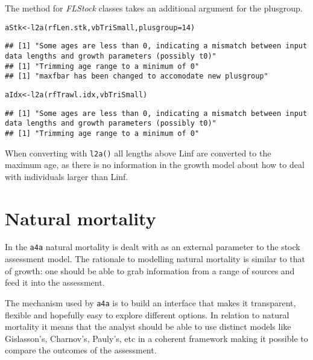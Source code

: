 \documentclass[a4paper,english,10pt]{article}\usepackage[]{graphicx}\usepackage[]{color}
\makeatletter
\newcommand{\hlnum}[1]{\textcolor[rgb]{0.2,0.2,0.2}{#1}}%
\newcommand{\hlstd}[1]{\textcolor[rgb]{0,0,0}{#1}}%
\newcommand{\hlkwb}[1]{\textcolor[rgb]{0.361,0.506,0.596}{#1}}%
\newcommand{\hlkwc}[1]{\textcolor[rgb]{0.361,0.506,0.596}{#1}}%
\newcommand{\hlkwd}[1]{\textcolor[rgb]{0.361,0.506,0.596}{#1}}%
\newenvironment{kframe}{%
 \def\at@end@of@kframe{}%
 \ifinner\ifhmode%
  \def\at@end@of@kframe{\end{minipage}}%
  \begin{minipage}{\columnwidth}%
 \fi\fi%
 \def\FrameCommand##1{\hskip\@totalleftmargin \hskip-\fboxsep
 \colorbox{shadecolor}{##1}\hskip-\fboxsep
     \hskip-\linewidth \hskip-\@totalleftmargin \hskip\columnwidth}%
 \MakeFramed {\advance\hsize-\width
   \@totalleftmargin\z@ \linewidth\hsize
   \@setminipage}}%
 {\par\unskip\endMakeFramed%
 \at@end@of@kframe}
\newenvironment{knitrout}{}{} %
\newcommand{\initiative}[1]{{\texttt{#1}}}
\newcommand{\code}[1]{{\texttt{#1}}}
\newcommand{\class}[1]{{\textit{#1}}}
\makeatother
\begin{document}
The method for \class{FLStock} classes takes an additional argument for the plusgroup.

\begin{knitrout}
\color{fgcolor}\begin{kframe}
\begin{alltt}
\hlstd{aStk} \hlkwb{<-} \hlkwd{l2a}\hlstd{(rfLen.stk, vbTriSmall,} \hlkwc{plusgroup}\hlstd{=}\hlnum{14}\hlstd{)}
\end{alltt}
\begin{verbatim}
## [1] "Some ages are less than 0, indicating a mismatch between input data lengths and growth parameters (possibly t0)"
## [1] "Trimming age range to a minimum of 0"
## [1] "maxfbar has been changed to accomodate new plusgroup"
\end{verbatim}
\begin{alltt}
\hlstd{aIdx} \hlkwb{<-} \hlkwd{l2a}\hlstd{(rfTrawl.idx, vbTriSmall)}
\end{alltt}
\begin{verbatim}
## [1] "Some ages are less than 0, indicating a mismatch between input data lengths and growth parameters (possibly t0)"
## [1] "Trimming age range to a minimum of 0"
\end{verbatim}
\end{kframe}
\end{knitrout}

When converting with \code{l2a()} all lengths above Linf are converted to the maximum age, as there is no information in the growth model about how to deal with individuals larger than Linf. 

\pagebreak
\section{Natural mortality}\label{sec:M}

In the \initiative{a4a} natural mortality is dealt with as an external parameter to the stock assessment model. The rationale to modelling natural mortality is similar to that of growth: one should be able to grab information from a range of sources and feed it into the assessment.

The mechanism used by \initiative{a4a} is to build an interface that makes it transparent, flexible and hopefully easy to explore different options. In relation to natural mortality it means that the analyst should be able to use distinct models like Gislasson's, Charnov's, Pauly's, etc in a coherent framework making it possible to compare the outcomes of the assessment. 
\end{document}
